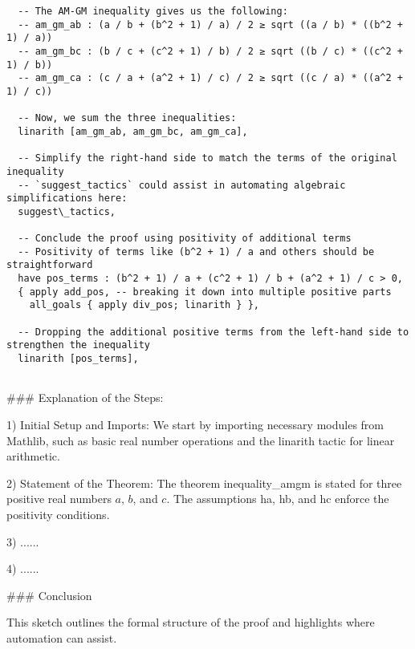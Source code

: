 \begin{tcolorbox}[breakable, enhanced, colback=black!5!white, colframe=black!75!white,  title=A Failed Case of \dsp]
{\begin{lstlisting}
  -- The AM-GM inequality gives us the following:
  -- am_gm_ab : (a / b + (b^2 + 1) / a) / 2 ≥ sqrt ((a / b) * ((b^2 + 1) / a))
  -- am_gm_bc : (b / c + (c^2 + 1) / b) / 2 ≥ sqrt ((b / c) * ((c^2 + 1) / b))
  -- am_gm_ca : (c / a + (a^2 + 1) / c) / 2 ≥ sqrt ((c / a) * ((a^2 + 1) / c))

  -- Now, we sum the three inequalities:
  linarith [am_gm_ab, am_gm_bc, am_gm_ca],

  -- Simplify the right-hand side to match the terms of the original inequality
  -- `suggest_tactics` could assist in automating algebraic simplifications here:
  suggest\_tactics,

  -- Conclude the proof using positivity of additional terms
  -- Positivity of terms like (b^2 + 1) / a and others should be straightforward
  have pos_terms : (b^2 + 1) / a + (c^2 + 1) / b + (a^2 + 1) / c > 0,
  { apply add_pos, -- breaking it down into multiple positive parts
    all_goals { apply div_pos; linarith } },

  -- Dropping the additional positive terms from the left-hand side to strengthen the inequality
  linarith [pos_terms],
  
\end{lstlisting}

\#\#\# Explanation of the Steps:

1) Initial Setup and Imports: We start by importing necessary modules from Mathlib, such as basic real number operations and the linarith tactic for linear arithmetic.

2) Statement of the Theorem: The theorem inequality\_amgm is stated for three positive real numbers $a$, $b$, and $c$. The assumptions ha, hb, and  hc enforce the positivity conditions.

3) ......

4) ......

\#\#\# Conclusion

This sketch outlines the formal structure of the proof and highlights where automation can assist.

}
\end{tcolorbox}